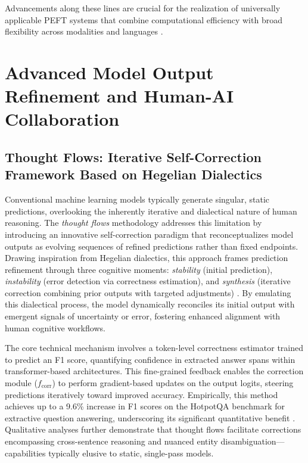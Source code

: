 \documentclass[sigconf]{acmart}
\begin{document}
Advancements along these lines are crucial for the realization of universally applicable PEFT systems that combine computational efficiency with broad flexibility across modalities and languages \cite{ref48}.

\section{Advanced Model Output Refinement and Human-AI Collaboration}

\subsection{Thought Flows: Iterative Self-Correction Framework Based on Hegelian Dialectics}

Conventional machine learning models typically generate singular, static predictions, overlooking the inherently iterative and dialectical nature of human reasoning. The \emph{thought flows} methodology addresses this limitation by introducing an innovative self-correction paradigm that reconceptualizes model outputs as evolving sequences of refined predictions rather than fixed endpoints. Drawing inspiration from Hegelian dialectics, this approach frames prediction refinement through three cognitive moments: \textit{stability} (initial prediction), \textit{instability} (error detection via correctness estimation), and \textit{synthesis} (iterative correction combining prior outputs with targeted adjustments) \cite{ref43}. By emulating this dialectical process, the model dynamically reconciles its initial output with emergent signals of uncertainty or error, fostering enhanced alignment with human cognitive workflows.

The core technical mechanism involves a token-level correctness estimator trained to predict an F1 score, quantifying confidence in extracted answer spans within transformer-based architectures. This fine-grained feedback enables the correction module ($f_{\text{corr}}$) to perform gradient-based updates on the output logits, steering predictions iteratively toward improved accuracy. Empirically, this method achieves up to a 9.6\% increase in F1 scores on the HotpotQA benchmark for extractive question answering, underscoring its significant quantitative benefit \cite{ref43}. Qualitative analyses further demonstrate that thought flows facilitate corrections encompassing cross-sentence reasoning and nuanced entity disambiguation—capabilities typically elusive to static, single-pass models.
\end{document}
